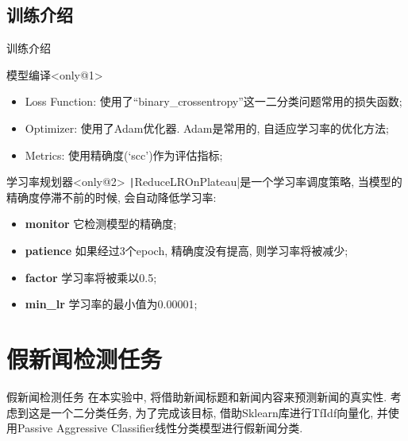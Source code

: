 \documentclass{beamer}
\begin{document}
\subsection{训练介绍}
\begin{frame}[fragile]{训练介绍}
	\begin{block}{模型编译}<only@1>
		\begin{itemize}
			\item Loss Function: 使用了``binary\_crossentropy''这一二分类问题常用的损失函数;
			\item Optimizer: 使用了Adam优化器. Adam是常用的, 自适应学习率的优化方法;
			\item Metrics: 使用精确度(`scc')作为评估指标;
		\end{itemize}
	\end{block}
	\begin{block}{学习率规划器}<only@2>
		\texttt|ReduceLROnPlateau|是一个学习率调度策略, 当模型的精确度停滞不前的时候, 会自动降低学习率:
		\begin{itemize}
			\item \textbf{monitor} 它检测模型的精确度;
			\item \textbf{patience} 如果经过3个epoch, 精确度没有提高, 则学习率将被减少;
			\item \textbf{factor} 学习率将被乘以0.5;
			\item \textbf{min\_lr} 学习率的最小值为0.00001;
		\end{itemize}
	\end{block}
\end{frame}

\section{假新闻检测任务}
\begin{frame}[fragile]{假新闻检测任务}
	在本实验中, 将借助新闻标题和新闻内容来预测新闻的真实性. 考虑到这是一个二分类任务, 为了完成该目标, 借助Sklearn库进行TfIdf向量化, 并使用Passive Aggressive Classifier线性分类模型进行假新闻分类.
\end{frame}
\end{document}
